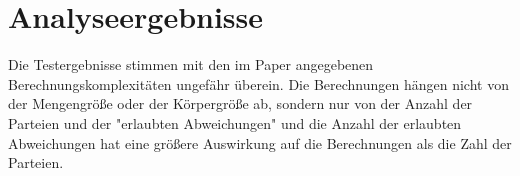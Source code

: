 \section{Analyseergebnisse}
Die Testergebnisse stimmen mit den im Paper angegebenen Berechnungskomplexitäten ungefähr überein. Die Berechnungen hängen nicht von der Mengengröße oder der Körpergröße ab, sondern nur von der Anzahl der Parteien und der "erlaubten Abweichungen" und die Anzahl der erlaubten Abweichungen hat eine größere Auswirkung auf die Berechnungen als die Zahl der Parteien. 





